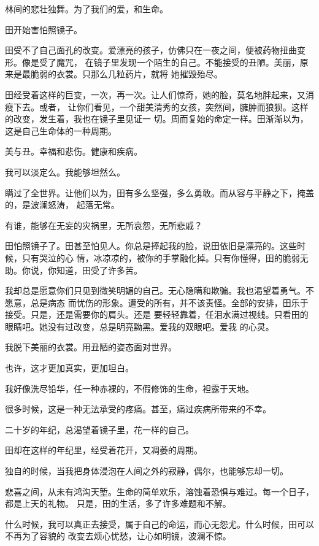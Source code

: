 
		林间的悲壮独舞。为了我们的爱，和生命。

		田开始害怕照镜子。

		田受不了自己面孔的改变。爱漂亮的孩子，仿佛只在一夜之间，便被药物扭曲变形。像是受了魔咒，
	在镜子里发现一个陌生的自己。不能接受的丑陋。美丽，原来是最脆弱的衣裳。只那么几粒药片，就将
	她摧毁殆尽。

		田经受着这样的巨变，一次，再一次。让人们惊奇，她的脸，莫名地胖起来，又消瘦下去。或者，
	让你们看见，一个甜美清秀的女孩，突然间，臃肿而狼狈。这样的改变，发生着，我也在镜子里见证一
	切。周而复始的命定一样。田渐渐以为，这是自己生命体的一种周期。

		美与丑。幸福和悲伤。健康和疾病。

		我可以淡定么。我能够坦然么。

		瞒过了全世界。让他们以为，田有多么坚强，多么勇敢。而从容与平静之下，掩盖的，是波澜怒涛，
	起落无常。

		有谁，能够在无妄的灾祸里，无所哀怨，无所悲戚？

		田怕照镜子了。田甚至怕见人。你总是捧起我的脸，说田依旧是漂亮的。这些时候，只有哭泣的心
	情，冰凉凉的，被你的手掌融化掉。只有你懂得，田的脆弱无助。你说，你知道，田受了许多苦。

		我却总是愿意你们只见到微笑明媚的自己。无心隐瞒和欺骗。我也渴望着勇气。不愿意，总是病态
	而忧伤的形象。遭受的所有，并不该责怪。全部的安排，田乐于接受。只是，还是需要你的肩头。还是
	要轻轻靠着，任泪水满过视线。只看田的眼睛吧。她没有过改变，总是明亮黝黑。爱我的双眼吧。爱我
	的心灵。

		我脱下美丽的衣裳。用丑陋的姿态面对世界。

		也许，这才更加真实，更加坦白。

		我好像洗尽铅华，任一种赤裸的，不假修饰的生命，袒露于天地。

		很多时候，这是一种无法承受的疼痛。甚至，痛过疾病所带来的不幸。

		二十岁的年纪，总渴望着镜子里，花一样的自己。

		田却在这样的年纪里，经受着花开，又凋萎的周期。

		独自的时候，当我把身体浸泡在人间之外的寂静，偶尔，也能够忘却一切。

		悲喜之间，从未有鸿沟天堑。生命的简单欢乐，溶蚀着恐惧与难过。每一个日子，都是上天的礼物。
	只是，田的生活，多了许多难题和不解。

		什么时候，我可以真正去接受，属于自己的命运，而心无怨尤。什么时候，田可以不再为了容貌的
	改变去烦心忧愁，让心如明镜，波澜不惊。

